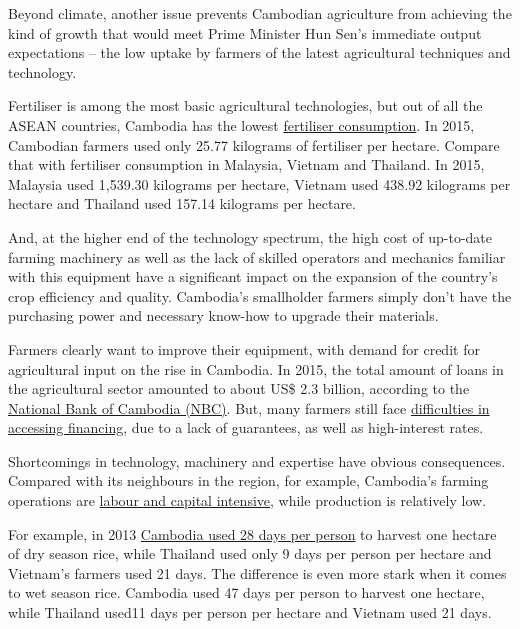 \documentclass[10pt,a4paper]{letter}
\begin{document}
Beyond climate, another issue prevents Cambodian agriculture from achieving the kind of growth that would meet Prime Minister Hun Sen's immediate output expectations -- the low uptake by farmers of the latest agricultural techniques and technology.

Fertiliser is among the most basic agricultural technologies, but out of all the ASEAN countries, Cambodia has the lowest \href{https://datacatalog.worldbank.org/dataset/world-development-indicators}{fertiliser consumption}. In 2015, Cambodian farmers used only 25.77 kilograms of fertiliser per hectare. Compare that with fertiliser consumption in Malaysia, Vietnam and Thailand. In 2015, Malaysia used 1,539.30 kilograms per hectare, Vietnam used 438.92 kilograms per hectare and Thailand used 157.14 kilograms per hectare.

And, at the higher end of the technology spectrum, the high cost of up-to-date farming machinery as well as the lack of skilled operators and mechanics familiar with this equipment have a significant impact on the expansion of the country's crop efficiency and quality. Cambodia's smallholder farmers simply don't have the purchasing power and necessary know-how to upgrade their materials.

Farmers clearly want to improve their equipment, with demand for credit for agricultural input on the rise in Cambodia. In 2015, the total amount of loans in the agricultural sector amounted to about US\$ 2.3 billion, according to the \href{https://www.nbc.org.kh/economic_research/banks_reports.php}{National Bank of Cambodia (NBC)}. But, many farmers still face \href{http://www.ukabc.org.uk/wp-content/uploads/2017/04/AgriProject_Reporting_FINAL-VERSION-copy.pdf}{difficulties in accessing financing}, due to a lack of guarantees, as well as high-interest rates.

Shortcomings in technology, machinery and expertise have obvious consequences. Compared with its neighbours in the region, for example, Cambodia's farming operations are \href{https://ourworldindata.org/grapher/human-capital-index-vs-gdp?country=AFG+ARM+AZE+BHR+BGD+KHM+CHN+GEO+HKG+IND+IDN+IRN+IRQ+ISR+JPN+JOR+KAZ+KOR+KWT+KGZ+LAO+LBN+MAC+MYS+MNG+MMR+NPL+OMN+PAK+PHL+QAT+SAU+SGP+LKA+TJK+THA+TLS+TUR+ARE+VNM+PSE+YEM}{labour and capital intensive}, while production is relatively low.

For example, in 2013 \href{https://www.nbc.org.kh/download_files/research_papers/english/3.1.Agriculture-labor-productivity.pdf}{Cambodia used 28 days per person} to harvest one hectare of dry season rice, while Thailand used only 9 days per person per hectare and Vietnam's farmers used 21 days. The difference is even more stark when it comes to wet season rice. Cambodia used 47 days per person to harvest one hectare, while Thailand used11 days per person per hectare and Vietnam used 21 days.
\end{document}
